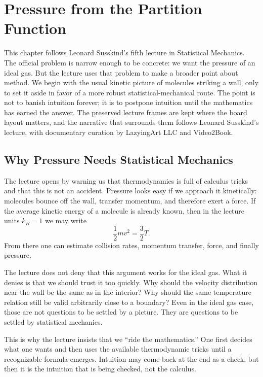 \chapter{Pressure from the Partition Function}

This chapter follows Leonard Susskind's fifth lecture in Statistical Mechanics. The official problem is narrow enough to be concrete: we want the pressure of an ideal gas. But the lecture uses that problem to make a broader point about method. We begin with the usual kinetic picture of molecules striking a wall, only to set it aside in favor of a more robust statistical-mechanical route. The point is not to banish intuition forever; it is to postpone intuition until the mathematics has earned the answer. The preserved lecture frames are kept where the board layout matters, and the narrative that surrounds them follows Leonard Susskind's lecture, with documentary curation by LazyingArt LLC and Video2Book.

\section{Why Pressure Needs Statistical Mechanics}

The lecture opens by warning us that thermodynamics is full of calculus tricks and that this is not an accident. Pressure looks easy if we approach it kinetically: molecules bounce off the wall, transfer momentum, and therefore exert a force. If the average kinetic energy of a molecule is already known, then in the lecture units \(k_B=1\) we may write
\begin{equation}
\frac{1}{2}mv^2=\frac{3}{2}T.
\end{equation}
From there one can estimate collision rates, momentum transfer, force, and finally pressure.

The lecture does not deny that this argument works for the ideal gas. What it denies is that we should trust it too quickly. Why should the velocity distribution near the wall be the same as in the interior? Why should the same temperature relation still be valid arbitrarily close to a boundary? Even in the ideal gas case, those are not questions to be settled by a picture. They are questions to be settled by statistical mechanics.

This is why the lecture insists that we ``ride the mathematics.'' One first decides what one wants and then uses the available thermodynamic tricks until a recognizable formula emerges. Intuition may come back at the end as a check, but then it is the intuition that is being checked, not the calculus.

